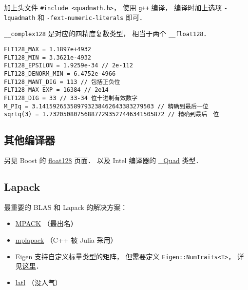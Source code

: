 加上头文件 \verb|#include <quadmath.h>|， 使用 \verb|g++| 编译， 编译时加上选项 \verb|-lquadmath| 和 \verb|-fext-numeric-literals| 即可．

\verb|__complex128| 是对应的四精度复数类型， 相当于两个 \verb|__float128|．

\begin{lstlisting}
FLT128_MAX = 1.1897e+4932
FLT128_MIN = 3.3621e-4932
FLT128_EPSILON = 1.9259e-34 // 2e-112
FLT128_DENORM_MIN = 6.4752e-4966
FLT128_MANT_DIG = 113 // 包括正负位
FLT128_MAX_EXP = 16384 // 2e14
FLT128_DIG = 33 // 33-34 位十进制有效数字
M_PIq = 3.141592653589793238462643383279503 // 精确到最后一位
sqrtq(3) = 1.732050807568877293527446341505872 // 精确到最后一位
\end{lstlisting}

\subsection{其他编译器}
另见 Boost 的 \href{https://www.boost.org/doc/libs/develop/libs/multiprecision/doc/html/boost_multiprecision/tut/floats/float128.html}{float128} 页面． 以及 Intel 编译器的 \href{https://community.intel.com/t5/Intel-C-Compiler/Quad-precision-Quad-data-type/td-p/1218636}{_Quad} 类型．

\subsection{Lapack}
最重要的 BLAS 和 Lapack 的解决方案：
\begin{itemize}
\item \href{http://mplapack.sourceforge.net/}{MPACK} （最出名）
\item \href{https://github.com/nakatamaho/mplapack}{mplapack} （C++ 被 Julia 采用）
\item Eigen 支持自定义标量类型的矩阵， 但需要定义 \verb|Eigen::NumTraits<T>|， 详见\href{https://eigen.tuxfamily.org/dox/TopicCustomizing_CustomScalar.html}{这里}．
\item \href{https://github.com/langou/latl}{latl} （没人气）
\end{itemize}
